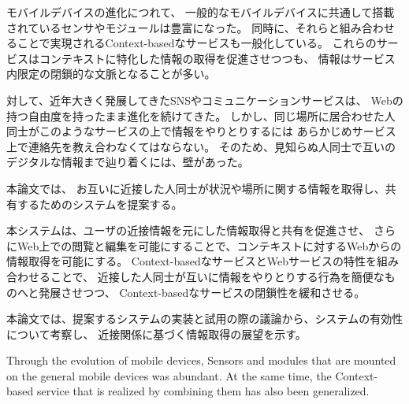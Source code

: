 


\begin{jabstract}

モバイルデバイスの進化につれて、
一般的なモバイルデバイスに共通して搭載されているセンサやモジュールは豊富になった。
同時に、それらと組み合わせることで実現されるContext-basedなサービスも一般化している。
これらのサービスはコンテキストに特化した情報の取得を促進させつつも、
情報はサービス内限定の閉鎖的な文脈となることが多い。

対して、近年大きく発展してきたSNSやコミュニケーションサービスは、
Webの持つ自由度を持ったまま進化を続けてきた。
しかし、同じ場所に居合わせた人同士がこのようなサービスの上で情報をやりとりするには
あらかじめサービス上で連絡先を教え合わなくてはならない。
そのため、見知らぬ人同士で互いのデジタルな情報まで辿り着くには、壁があった。

本論文では、
お互いに近接した人同士が状況や場所に関する情報を取得し、共有するためのシステムを提案する。

本システムは、ユーザの近接情報を元にした情報取得と共有を促進させ、
さらにWeb上での閲覧と編集を可能にすることで、コンテキストに対するWebからの情報取得を可能にする。
Context-basedなサービスとWebサービスの特性を組み合わせることで、
近接した人同士が互いに情報をやりとりする行為を簡便なものへと発展させつつ、
Context-basedなサービスの閉鎖性を緩和させる。

本論文では、提案するシステムの実装と試用の際の議論から、システムの有効性について考察し、
近接関係に基づく情報取得の展望を示す。


\end{jabstract}



\begin{eabstract}

Through the evolution of mobile devices,
Sensors and modules that are mounted on the general mobile devices was abundant.
At the same time, the Context-based service that is realized by combining them has also been generalized.


\end{eabstract}
